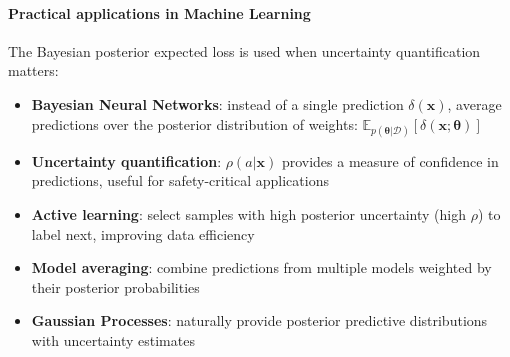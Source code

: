 \paragraph{Practical applications in Machine Learning}
The Bayesian posterior expected loss is used when uncertainty quantification matters:
\begin{itemize}
    \item \textbf{Bayesian Neural Networks}: instead of a single prediction $\delta(\bm{x})$,
        average predictions over the posterior distribution of weights:
        $\mathbb{E}_{p(\bm{\theta}|\mathcal{D})}[\delta(\bm{x}; \bm{\theta})]$
    \item \textbf{Uncertainty quantification}: $\rho(a|\bm{x})$ provides a measure of
        confidence in predictions, useful for safety-critical applications
    \item \textbf{Active learning}: select samples with high posterior uncertainty
        (high $\rho$) to label next, improving data efficiency
    \item \textbf{Model averaging}: combine predictions from multiple models weighted
        by their posterior probabilities
    \item \textbf{Gaussian Processes}: naturally provide posterior predictive distributions
        with uncertainty estimates
\end{itemize}

